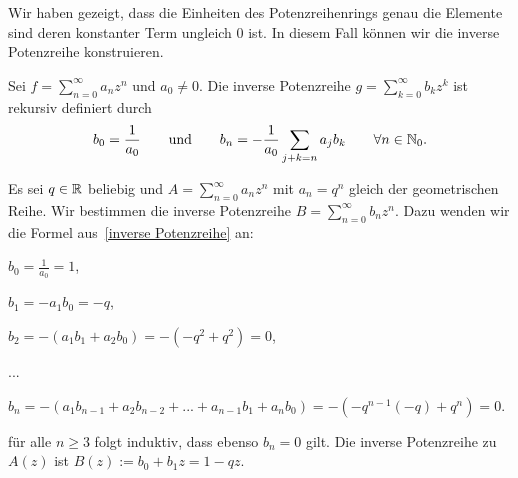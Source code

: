 %
%
Wir haben gezeigt, dass die Einheiten des Potenzreihenrings genau die Elemente sind deren konstanter Term ungleich $0$ ist. In diesem Fall können wir die inverse Potenzreihe  konstruieren.\\
\begin{satz}\label{inverse Potenzreihe}
Sei $f = \sum\limits_{n=0}^{\infty}a_nz^n $ und $a_0 \neq 0$. Die inverse Potenzreihe
$g = \sum_{k=0}^\infty b_k z^k$ ist rekursiv definiert durch
\begin{equation*}
b_0 = \frac{1}{a_0} ~~~~~ \text{ und }~~~~~ b_n = -\frac{1}{a_0}\sum\limits_{j +k =n} a_j b_{k}	 ~~~~~~\forall n\in\mathbb{N}_0.
\end{equation*}
\end{satz}
%
\begin{bsp} %
Es sei $q \in \mathbb{R}$ beliebig und $A = \sum_{n=0}^{\infty}a_n z^n$ mit $a_n = q^n$ gleich der geometrischen Reihe. Wir bestimmen die inverse Potenzreihe $B = \sum_{n = 0}^{\infty} b_n z^n$. Dazu wenden wir die Formel aus~\ref{inverse Potenzreihe} an:
\begin{center}
\begin{description}
\item $b_0 = \frac{1}{a_0} = 1$,
\item $b_1 = -a_1b_0 = -q$,
\item $b_2 = -\left(a_1b_1 + a_2b_0\right) = -\left(-q^2 + q^2\right) = 0$,
\item ...
\item $b_n = -\left(a_1b_{n-1} + a_2b_{n-2} + ... + a_{n-1}b_1 + a_nb_0\right) = -\left(-q^{n-1}(-q) + q^n\right) = 0$.
\end{description}
\end{center}
für alle $n \ge 3$ folgt induktiv, dass ebenso $b_n = 0$ gilt. Die inverse Potenzreihe zu $A(z)$ ist $B(z) := b_0 + b_1z = 1 - qz$. 
\end{bsp}
%
%
%
%
%
%
%
%
%
%

